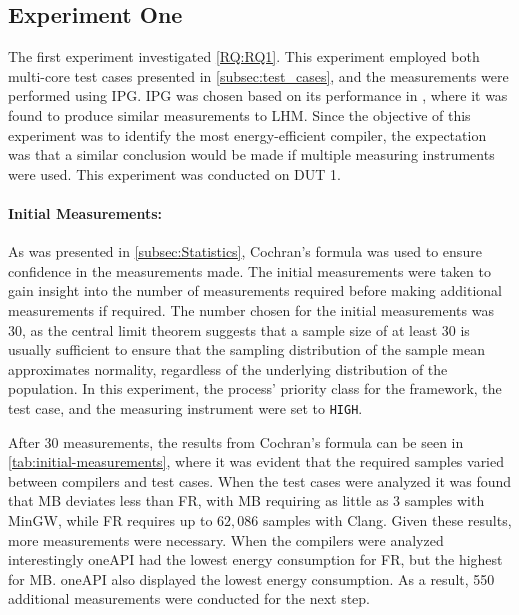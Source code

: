 \subsection{Experiment One}\label{subsec:exp_one}

The first experiment investigated \cref{RQ:RQ1}. This experiment employed both multi-core test cases presented in \cref{subsec:test_cases}, and the measurements were performed using IPG. IPG was chosen based on its performance in \cite{biksbois}, where it was found to produce similar measurements to LHM. Since the objective of this experiment was to identify the most energy-efficient compiler, the expectation was that a similar conclusion would be made if multiple measuring instruments were used. This experiment was conducted on DUT 1.  

\paragraph{Initial Measurements:} As was presented in \cref{subsec:Statistics}, Cochran's formula was used to ensure confidence in the measurements made. The initial measurements were taken to gain insight into the number of measurements required before making additional measurements if required. The number chosen for the initial measurements was 30, as the central limit theorem suggests that a sample size of at least 30 is usually sufficient to ensure that the sampling distribution of the sample mean approximates normality, regardless of the underlying distribution of the population\cite{central-limit-theorem}. In this experiment, the process' priority class for the framework, the test case, and the measuring instrument were set to \texttt{HIGH}.

After 30 measurements, the results from Cochran's formula can be seen in \cref{tab:initial-measurements}, where it was evident that the required samples varied between compilers and test cases. When the test cases were analyzed it was found that MB deviates less than FR, with MB requiring as little as $3$ samples with MinGW, while FR requires up to $62,086$ samples with Clang. Given these results, more measurements were necessary. When the compilers were analyzed interestingly oneAPI had the lowest energy consumption for FR, but the highest for MB. oneAPI also displayed the lowest energy consumption. As a result, 550 additional measurements were conducted for the next step.



